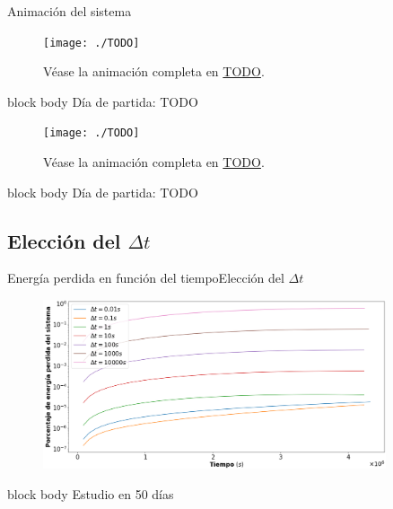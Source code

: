 \documentclass{beamer}
\begin{document}
            \begin{frame}{Animación del sistema}{}
                \begin{minipage}[t]{0.49\textwidth}
                    \begin{figure}[H!]
                        \texttt{[image: ./TODO]}
                        \caption*{Véase la animación completa en \url{TODO}.}
                        \label{fig:marte_1}
                    \end{figure}
                    \begin{beamercolorbox}[sep=5pt,center]{block body}
                        \centering
                        \small{Día de partida: TODO}
                    \end{beamercolorbox}
                \end{minipage}
                \hfill
                \begin{minipage}[t]{0.49\textwidth}
                    \begin{figure}[H!]
                        \texttt{[image: ./TODO]}
                        \caption*{Véase la animación completa en \url{TODO}.}
                        \label{fig:marte_2}
                    \end{figure}
                    \begin{beamercolorbox}[sep=5pt,center]{block body}
                        \centering
                        \small{Día de partida: TODO}
                    \end{beamercolorbox}
                \end{minipage}
            \end{frame}

        \subsection{Elección del $\Delta t$}

            \begin{frame}{Energía perdida en función del tiempo}{Elección del $\Delta t$}
                    \begin{figure}[H!]
                        \includegraphics[width=0.9\textwidth]{./energia_perdida_vs_tiempo}
                        \label{fig:marte_3}
                    \end{figure}
                    \begin{beamercolorbox}[sep=5pt,center]{block body}
                        \centering
                        \small{Estudio en 50 días}
                    \end{beamercolorbox}
            \end{frame}
\end{document}
